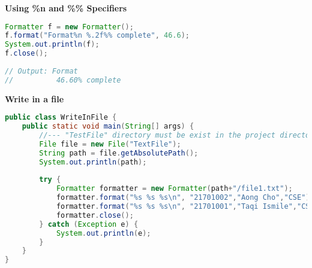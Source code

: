 \textbf{Using \%n and \%\% Specifiers}

\begin{lstlisting}[language=java]
Formatter f = new Formatter();
f.format("Format%n %.2f%% complete", 46.6);
System.out.println(f);
f.close();
	
// Output: Format
//			46.60% complete
\end{lstlisting}

\textbf{Write in a file}

\begin{lstlisting}[language=java]
public class WriteInFile {
	public static void main(String[] args) {
		//--- "TestFile" directory must be exist in the project directory
		File file = new File("TextFile");
		String path = file.getAbsolutePath();
		System.out.println(path);
		
		try {
			Formatter formatter = new Formatter(path+"/file1.txt");
			formatter.format("%s %s %s\n", "21701002","Aong Cho","CSE");
			formatter.format("%s %s %s\n", "21701001","Taqi Ismile","CSE");
			formatter.close();
		} catch (Exception e) {
			System.out.println(e);
		}
	}
}
\end{lstlisting}





